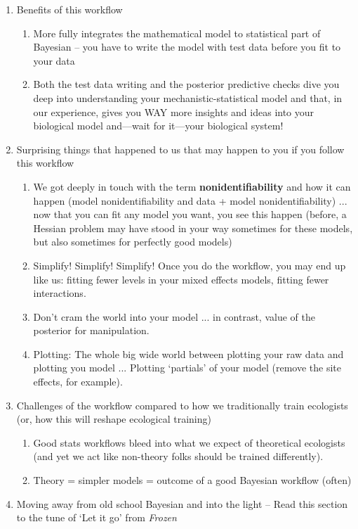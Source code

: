 \documentclass[11pt]{article}
\begin{document}
\begin{enumerate}
\item Benefits of this workflow
\begin{enumerate}
\item More fully integrates the mathematical model to statistical part of Bayesian -- you have to write the model with test data before you fit to your data
\item Both the test data writing and the posterior predictive checks dive you deep into understanding your mechanistic-statistical model and that, in our experience, gives you WAY more insights and ideas into your biological model and---wait for it---your biological system!
\end{enumerate}
\item Surprising things that happened to us that may happen to you if you follow this workflow
\begin{enumerate}
\item We got deeply in touch with the term {\bf nonidentifiability} and how it can happen (model nonidentifiability and data + model nonidentifiability) ... now that you can fit any model you want, you see this happen (before, a Hessian problem may have stood in your way sometimes for these models, but also sometimes for perfectly good models)
\item Simplify! Simplify! Simplify! Once you do the workflow, you may end up like us: fitting fewer levels in your mixed effects models, fitting fewer interactions.
\item Don't cram the world into your model ... in contrast, value of the posterior for manipulation. 
\item Plotting: The whole big wide world between plotting your raw data and plotting you model ... Plotting `partials' of your model (remove the site effects, for example).
\end{enumerate}
\item Challenges of the workflow compared to how we traditionally train ecologists (or, how this will reshape ecological training)
\begin{enumerate}
\item Good stats workflows bleed into what we expect of theoretical ecologists (and yet we act like non-theory folks should be trained differently). 
\item Theory = simpler models = outcome of a good Bayesian workflow (often)
\end{enumerate}
\item Moving away from old school Bayesian and into the light -- Read this section to the tune of `Let it go' from \emph{Frozen} 

\end{enumerate}
\end{document}
